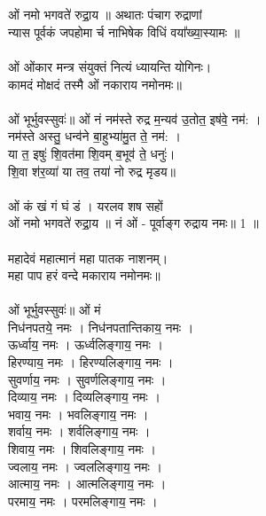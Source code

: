 \section{}
\subsection{}
ओं नमो भगवते॑ रुद्रा॒य ॥ अथातः पंचाग रुद्राणां\\
न्यास पूर्वकं जपहोमा र्च नाभिषेक विधिं वया᳚ख्या॒स्यामः ॥\\
\\
ओं  ओंकार मन्त्र संयुक्तं नित्यं ध्यायन्ति योगिनः।\\
कामदं मोक्षदं तस्मै ओं नकाराय नमोनमः॥\\
\\
ओं भूर्भुवस्सुवः॑॥ ओं नं नम॑स्ते रुद्र म॒न्यव॑ उ॒तोत॒ इष॑वे॒ नम॑: ।\\
नम॑स्ते अस्तु॒ धन्व॑ने बा॒हुभ्या॑मु॒त ते॒ नम॑: ।\\
{\small{} या त॒ इषुः॑ शि॒वत॑मा शि॒वम् ब॒भूव॑ ते॒ धनुः॑।\\
शि॒वा श॑र॒व्या॑ या तव॒ तया॑ नो रुद्र मृडय॥}\\
{\small{}}\\
ओं कं खं गं घं डं । {\small यरलव शष सहों}\\
ओं नमो भगवते॑ रुद्रा॒य ॥ नं ओं - पूर्वाङ्ग रुद्राय नमः॥ 1 ॥\\
\\
महादेवं महात्मानं महा पातक नाशनम्।\\
महा पाप हरं वन्दे मकाराय नमोनमः॥\\
\\
ओं भूर्भुवस्सुवः॑॥ ओं मं \\
निध॑नपतये॒ नमः । निध॑नपतान्तिकाय॒ नमः ।\\
ऊर्ध्वाय॒ नमः । ऊर्ध्वलिङ्गाय॒ नमः ।\\
हिरण्याय॒ नमः । हिरण्यलिङ्गाय॒ नमः ।\\
सुवर्णाय॒ नमः । सुवर्णलिङ्गाय॒ नमः ।\\
दिव्याय॒ नमः । दिव्यलिङ्गाय॒ नमः ।\\
भवाय॒ नमः । भवलिङ्गाय॒ नमः ।\\
शर्वाय॒ नमः । शर्वलिङ्गाय॒ नमः ।\\
शिवाय॒ नमः । शिवलिङ्गाय॒ नमः ।\\
ज्वलाय॒ नमः । ज्वललिङ्गाय॒ नमः ।\\
आत्माय॒ नमः । आत्मलिङ्गाय॒ नमः ।\\
परमाय॒ नमः । परमलिङ्गाय॒ नमः ।\\

